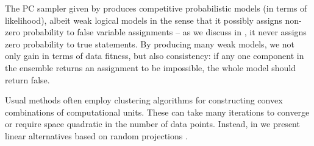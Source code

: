 The PC sampler given by \citet{geh21a} produces competitive probabilistic models (in terms of
likelihood), albeit weak logical models in the sense that it possibly assigns non-zero probability
to false variable assignments -- as we discuss in , it never assigns zero
probability to true statements. By producing many weak models, we not only gain in terms of data
fitness, but also consistency: if any one component in the ensemble returns an assignment to be
impossible, the whole model should return false.


Usual methods often employ clustering algorithms for constructing convex combinations of
computational units. These can take many iterations to converge or require space quadratic in the
number of data points. Instead, in  we present linear alternatives based on random
projections \citep{dasgupta08a,dasgupta08b}.
